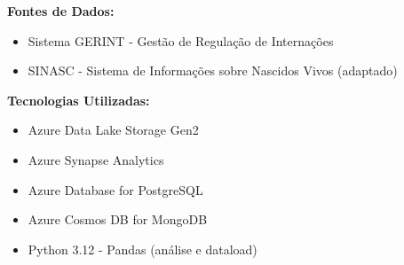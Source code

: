 \documentclass[12pt,a4paper]{article}
\begin{document}
\vspace{1cm}

\textbf{Fontes de Dados:}
\begin{itemize}
    \item Sistema GERINT - Gestão de Regulação de Internações
    \item SINASC - Sistema de Informações sobre Nascidos Vivos (adaptado)
\end{itemize}

\textbf{Tecnologias Utilizadas:}
\begin{itemize}
    \item Azure Data Lake Storage Gen2
    \item Azure Synapse Analytics  
    \item Azure Database for PostgreSQL
    \item Azure Cosmos DB for MongoDB
    \item Python 3.12 - Pandas (análise e dataload)
\end{itemize}
\end{document}
